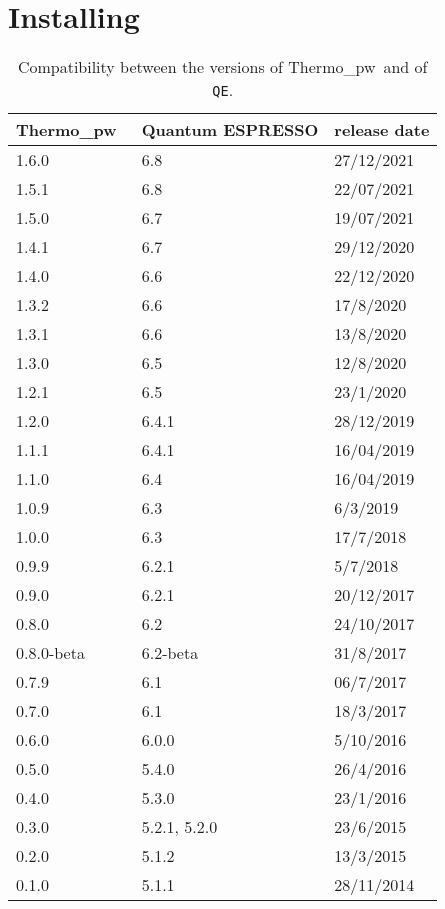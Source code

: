 \documentclass[12pt,a4paper,twoside]{report}
\def\qe{{\sc Quantum ESPRESSO}}
\def\thermo{{\sc Thermo\_pw}}
\begin{document}
{\color{coral}\section{Installing}}
\color{black}
\begin{table}
\begin{center}
\begin{tabular}{lll}
\hline
\hline
\thermo\ & \qe & release date \\
\hline
1.6.0 & 6.8 & 27/12/2021\\
1.5.1 & 6.8 & 22/07/2021 \\
1.5.0 & 6.7 & 19/07/2021 \\
1.4.1 & 6.7 & 29/12/2020 \\
1.4.0 & 6.6 & 22/12/2020 \\
1.3.2 & 6.6 & 17/8/2020 \\
1.3.1 & 6.6 & 13/8/2020 \\
1.3.0 & 6.5 & 12/8/2020 \\
1.2.1 & 6.5 & 23/1/2020 \\
1.2.0 & 6.4.1 & 28/12/2019 \\
1.1.1 & 6.4.1 & 16/04/2019 \\
1.1.0 & 6.4 & 16/04/2019 \\
1.0.9 & 6.3 & 6/3/2019 \\
1.0.0 & 6.3 & 17/7/2018 \\
0.9.9 & 6.2.1 & 5/7/2018 \\
0.9.0 & 6.2.1 & 20/12/2017 \\
0.8.0 & 6.2 & 24/10/2017 \\
0.8.0-beta & 6.2-beta & 31/8/2017\\
0.7.9 & 6.1 & 06/7/2017 \\
0.7.0 & 6.1 & 18/3/2017 \\
0.6.0 & 6.0.0 & 5/10/2016 \\
0.5.0 & 5.4.0 & 26/4/2016 \\
0.4.0 & 5.3.0 & 23/1/2016 \\
0.3.0 & 5.2.1, 5.2.0 & 23/6/2015 \\
0.2.0 & 5.1.2 & 13/3/2015 \\
0.1.0 & 5.1.1 & 28/11/2014 \\
\hline
\hline
\end{tabular}
\caption{Compatibility between the versions of 
\thermo\ and of \texttt{QE}.}
\end{center}
\end{table}
\end{document}
